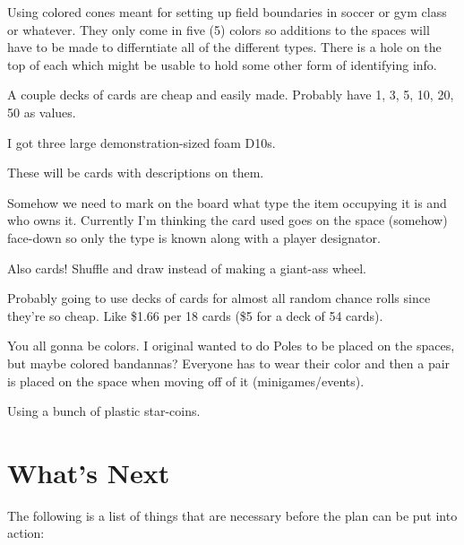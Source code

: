 \documentclass{article}
\begin{document}
\begin{description}[style=nextline]
\item[(*\_*) Board Spaces] Using colored cones meant for setting up field boundaries in
soccer or gym class or whatever.  They only come in five (5) colors so additions to the
spaces will have to be made to differntiate all of the different types.  There is a hole
on the top of each which might be usable to hold some other form of identifying info.

\item[Coins] A couple decks of cards are cheap and easily made.
Probably have 1, 3, 5, 10, 20, 50 as values.

\item[(*\_*) Dice] I got three large demonstration-sized foam D10s.

\item[Items] These will be cards with descriptions on them.

\item[Item Designators] Somehow we need to mark on the board what type the item
occupying it is and who owns it.  Currently I'm thinking the card used goes on the
space (somehow) face-down so only the type is known along with a player designator.

\item[Minigames] Also cards! Shuffle and draw instead of making a giant-ass wheel.

\item[Other Random Stuff] Probably going to use decks of cards for almost all random
chance rolls since they're so cheap.  Like \$1.66 per 18 cards (\$5 for a deck of 54 cards).

\item[Player Designation] You all gonna be colors.  I original wanted to do Poles to be placed on the spaces,
but maybe colored bandannas?  Everyone has to wear their color and then a pair is placed on the space when
moving off of it (minigames/events).

\item[(*\_*) Stars] Using a bunch of plastic star-coins.

\end{description}

\section{What's Next}

The following is a list of things that are necessary before the plan can be put into action:
\end{document}
